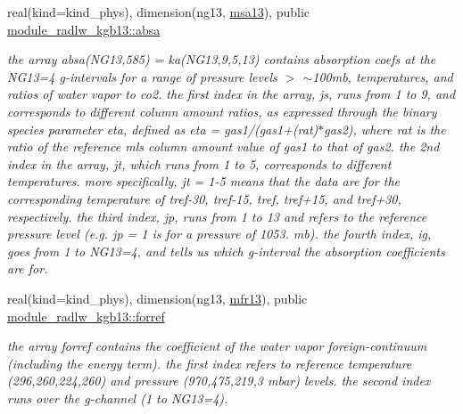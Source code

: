 \begin{DoxyCompactItemize}
\mbox{\label{group__module__radlw__kgbnn_ga22ce8d48ac3dceae1d52e80097fc2689}} 
real(kind=kind\+\_\+phys), dimension(ng13, \hyperlink{namespacemodule__radlw__kgb13_a07932a22e5f8de248765a207e170ce6f}{msa13}), public \hyperlink{group__module__radlw__kgbnn_ga22ce8d48ac3dceae1d52e80097fc2689}{module\+\_\+radlw\+\_\+kgb13\+::absa}
\begin{DoxyCompactList}\small\item\em the array absa(\+N\+G13,585) = ka(\+N\+G13,9,5,13) contains absorption coefs at the N\+G13=4 g-\/intervals for a range of pressure levels $>$ $\sim$100mb, temperatures, and ratios of water vapor to co2. the first index in the array, js, runs from 1 to 9, and corresponds to different column amount ratios, as expressed through the binary species parameter eta, defined as eta = gas1/(gas1+(rat)$\ast$gas2), where rat is the ratio of the reference mls column amount value of gas1 to that of gas2. the 2nd index in the array, jt, which runs from 1 to 5, corresponds to different temperatures. more specifically, jt = 1-\/5 means that the data are for the corresponding temperature of tref-\/30, tref-\/15, tref, tref+15, and tref+30, respectively. the third index, jp, runs from 1 to 13 and refers to the reference pressure level (e.\+g. jp = 1 is for a pressure of 1053. mb). the fourth index, ig, goes from 1 to N\+G13=4, and tells us which g-\/interval the absorption coefficients are for. \end{DoxyCompactList}\item 
\mbox{\label{group__module__radlw__kgbnn_ga93c6546ef5f8cbfc4f63de29e1ba2452}} 
real(kind=kind\+\_\+phys), dimension(ng13, \hyperlink{group__module__radlw__kgbnn_ga158782c955af9f50aaefea2d49af97ce}{mfr13}), public \hyperlink{group__module__radlw__kgbnn_ga93c6546ef5f8cbfc4f63de29e1ba2452}{module\+\_\+radlw\+\_\+kgb13\+::forref}
\begin{DoxyCompactList}\small\item\em the array forref contains the coefficient of the water vapor foreign-\/continuum (including the energy term). the first index refers to reference temperature (296,260,224,260) and pressure (970,475,219,3 mbar) levels. the second index runs over the g-\/channel (1 to N\+G13=4). \end{DoxyCompactList}\item 
\mbox{\label{group__module__radlw__kgbnn_gac8f58bba6aa4b72ffd01f78e60d0831f}} 

\end{DoxyCompactItemize}
